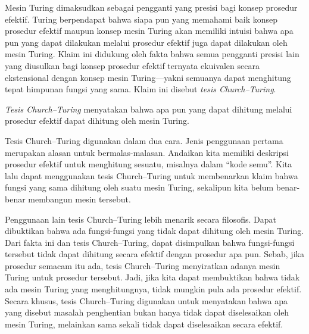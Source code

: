 \documentclass[../../../include/open-logic-section]{subfiles}
\begin{document}

Mesin Turing dimaksudkan sebagai pengganti yang presisi bagi konsep prosedur
efektif. Turing berpendapat bahwa siapa pun yang memahami baik konsep prosedur
efektif maupun konsep mesin Turing akan memiliki intuisi bahwa apa pun yang
dapat dilakukan melalui prosedur efektif juga dapat dilakukan oleh mesin
Turing. Klaim ini didukung oleh fakta bahwa semua pengganti presisi lain yang
diusulkan bagi konsep prosedur efektif ternyata ekuivalen secara ekstensional
dengan konsep mesin Turing---yakni semuanya dapat menghitung tepat himpunan
fungsi yang sama. Klaim ini disebut \emph{tesis Church--Turing}.

\begin{defn}
\emph{Tesis Church--Turing} menyatakan bahwa apa pun yang dapat dihitung
melalui prosedur efektif dapat dihitung oleh mesin Turing.
\end{defn}

Tesis Church--Turing digunakan dalam dua cara. Jenis penggunaan pertama
merupakan alasan untuk bermalas-malasan. Andaikan kita memiliki deskripsi
prosedur efektif untuk menghitung sesuatu, misalnya dalam ``kode semu''.
Kita lalu dapat menggunakan tesis Church--Turing untuk membenarkan klaim bahwa
fungsi yang sama dihitung oleh suatu mesin Turing, sekalipun kita belum
benar-benar membangun mesin tersebut.

Penggunaan lain tesis Church--Turing lebih menarik secara filosofis. Dapat
dibuktikan bahwa ada fungsi-fungsi yang tidak dapat dihitung oleh mesin Turing.
Dari fakta ini dan tesis Church--Turing, dapat disimpulkan bahwa fungsi-fungsi
tersebut tidak dapat dihitung secara efektif dengan prosedur apa pun. Sebab,
jika prosedur semacam itu ada, tesis Church--Turing menyiratkan adanya mesin
Turing untuk prosedur tersebut. Jadi, jika kita dapat membuktikan bahwa tidak
ada mesin Turing yang menghitungnya, tidak mungkin pula ada prosedur efektif.
Secara khusus, tesis Church--Turing digunakan untuk menyatakan bahwa apa yang
disebut masalah penghentian bukan hanya tidak dapat diselesaikan oleh mesin
Turing, melainkan sama sekali tidak dapat diselesaikan secara efektif.
\end{document}
